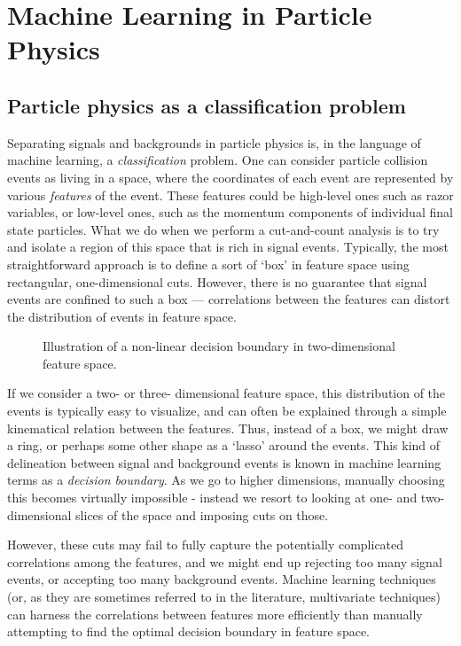 \chapter{Machine Learning in Particle Physics}\label{ch:MachineLearning}
\section{Particle physics as a classification problem}
Separating signals and backgrounds in particle physics is, in the language of machine learning, a \emph{classification} problem. One can consider particle collision events as living in a space, where the coordinates of each event are represented by various \emph{features} of the event. These features could be high-level ones such as razor variables, or low-level ones, such as the momentum components of individual final state particles. What we do when we perform a cut-and-count analysis is to try and isolate a region of this space that is rich in signal events. Typically, the most straightforward approach is to define a sort of `box' in feature space using rectangular, one-dimensional cuts. However, there is no guarantee that signal events are confined to such a box --- correlations between the features can distort the distribution of events in feature space. 
\strictpagecheck
\begin{figure}
  \begin{sidecaption}{Illustration of a non-linear decision boundary in two-dimensional feature space.}
  
\end{sidecaption}
\end{figure}
If we consider a two- or three- dimensional feature space, this distribution of the events is typically easy to visualize, and can often be explained through a simple kinematical relation between the features. Thus, instead of a box, we might draw a ring, or perhaps some other shape as a `lasso' around the events. This kind of delineation between signal and background events is known in machine learning terms as a \emph{decision boundary}. As we go to higher dimensions, manually choosing this becomes virtually impossible - instead we resort to looking at one- and two-dimensional slices of the space and imposing cuts on those. 

However, these cuts may fail to fully capture the potentially complicated correlations among the features, and we might end up rejecting too many signal events, or accepting too many background events. Machine learning techniques (or, as they are sometimes referred to in the literature, multivariate techniques) can harness the correlations between features more efficiently than manually attempting to find the optimal decision boundary in feature space.

